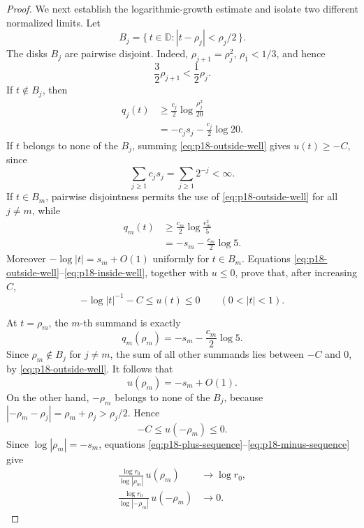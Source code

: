 \begin{proof}
We next establish the logarithmic-growth estimate and isolate two
different normalized limits.  Let
\[
                B_j=\{\,t\in\mathbb D:
                         |t-\rho_j|<\rho_j/2\,\}.
\]
The disks \(B_j\) are pairwise disjoint.  Indeed,
\(\rho_{j+1}=\rho_j^2\), \(\rho_1<1/3\), and hence
\[
                    \frac32\rho_{j+1}
                    <\frac12\rho_j .
\]
If \(t\notin B_j\), then
\[
\begin{aligned}
 q_j(t)
 &\geq\frac{c_j}{2}
       \log\frac{\rho_j^2}{20}\\
 &=-c_js_j-\frac{c_j}{2}\log20.
\end{aligned}
\tag{5}\label{eq:p18-outside-well}
\]
If \(t\) belongs to none of the \(B_j\), summing
\eqref{eq:p18-outside-well} gives \(u(t)\geq-C\), since
\[
                \sum_{j\geq1}c_js_j=\sum_{j\geq1}2^{-j}<\infty.
\]
If \(t\in B_m\), pairwise disjointness permits the use of
\eqref{eq:p18-outside-well} for all \(j\ne m\), while
\[
\begin{aligned}
 q_m(t)
 &\geq\frac{c_m}{2}\log\frac{\epsilon_m^2}{5}\\
 &=-s_m-\frac{c_m}{2}\log5.
\end{aligned}
\tag{6}\label{eq:p18-inside-well}
\]
Moreover \(-\log|t|=s_m+O(1)\) uniformly for \(t\in B_m\).
Equations \eqref{eq:p18-outside-well}--\eqref{eq:p18-inside-well},
together with \(u\leq0\), prove that, after increasing \(C\),
\[
             -\log|t|^{-1}-C\leq u(t)\leq0
             \qquad(0<|t|<1).
\tag{7}\label{eq:p18-log-growth}
\]

At \(t=\rho_m\), the \(m\)-th summand is exactly
\[
                  q_m(\rho_m)
                  =-s_m-\frac{c_m}{2}\log5.
\]
Since \(\rho_m\notin B_j\) for \(j\ne m\), the sum of all other
summands lies between \(-C\) and \(0\), by
\eqref{eq:p18-outside-well}.  It follows that
\[
                         u(\rho_m)=-s_m+O(1).
\tag{8}\label{eq:p18-plus-sequence}
\]
On the other hand, \(-\rho_m\) belongs to none of the \(B_j\), because
\(|-\rho_m-\rho_j|=\rho_m+\rho_j>\rho_j/2\).  Hence
\[
                         -C\leq u(-\rho_m)\leq0.
\tag{9}\label{eq:p18-minus-sequence}
\]
Since \(\log|\rho_m|=-s_m\), equations
\eqref{eq:p18-plus-sequence}--\eqref{eq:p18-minus-sequence} give
\[
\begin{aligned}
 \frac{\log r_0}{\log|\rho_m|}\,u(\rho_m)
   &\longrightarrow\log r_0,\\
 \frac{\log r_0}{\log|-\rho_m|}\,u(-\rho_m)
   &\longrightarrow0.
\end{aligned}
\tag{10}\label{eq:p18-two-limits}
\]


\end{proof}
